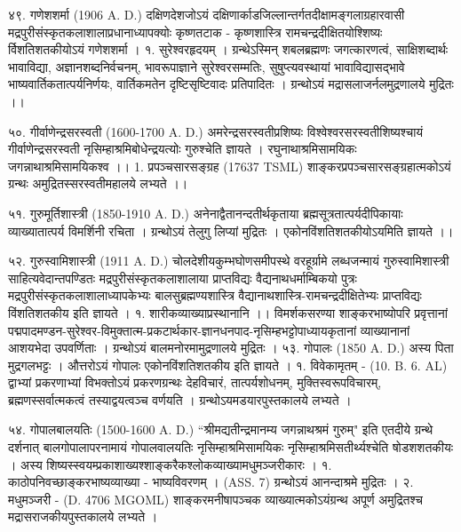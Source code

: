 ४९. गणेशशर्मा (1906 A. D.)
दक्षिणदेशजोऽयं दक्षिणार्काडजिल्लान्तर्गतदीक्षामङ्गलाग्रहारवासी मद्रपुरीसंस्कृतकलाशालाप्रधानाध्यापक्योः कृष्णतटाक - कृष्णशास्त्रि रामचन्द्रदीक्षितयोश्शिष्यः र्विशतिशतकीयोऽयं गणेशशर्मा ।
१. सुरेश्वरहृदयम् । ग्रन्थेऽस्मिन् शबलब्रह्मणः जगत्कारणत्वं, साक्षिशब्दार्थः भावाविद्या, अज्ञानशब्दनिर्वचनम्, भावरूपाज्ञाने सुरेश्वरसम्मतिः, सुषुप्त्यवस्थायां भावाविद्यासद्भावे भाष्यवार्तिकतात्पर्यनिर्णयः, वार्तिकमतेन दृष्टिसृष्टिवादः प्रतिपादितः । ग्रन्थोऽयं मद्रासलाजर्नलमुद्रणालये मुद्रितः ।।

५०. गीर्वाणेन्द्रसरस्वती (1600-1700 A. D.)
अमरेन्द्रसरस्वतीप्रशिष्यः विश्वेश्वरसरस्वतीशिष्यश्चायं गीर्वाणेन्द्रसरस्वती नृसिम्हाश्रमिबोधेन्द्रयत्योः गुरुश्चेति ज्ञायते । रघुनाथाश्रमिसामयिकः जगन्नाथाश्रमिसामयिकश्व ।।
1. प्रपञ्चसारसङ्ग्रह (17637 TSML)
शाङ्करप्रपञ्चसारसङ्ग्रहात्मकोऽयं ग्रन्थः अमुद्रितस्सरस्वतीमहालये लभ्यते ।।

५१. गुरुमूर्तिशास्त्री (1850-1910 A. D.)
अनेनाद्वैतानन्दतीर्थकृताया ब्रह्मसूत्रतात्पर्यदीपिकायाः व्याख्यातात्पर्य विमर्शिनी रचिता । ग्रन्थोऽयं तेलुगु लिप्यां मुद्रितः । एकोनविंशतिशतकीयोऽयमिति ज्ञायते ।।

५२.
गुरुस्वामिशास्त्री (1911 A. D.)
चोलदेशीयकुम्भघोणसमीपस्थे वरहूर्ग्रामे लब्धजन्मायं गुरुस्वामिशास्त्री साहित्यवेदान्तपण्डितः मद्रपुरीसंस्कृतकलाशालाया प्राप्तविद्यः वैद्यनाथधर्माम्बिकयो पुत्रः मद्रपुरीसंस्कृतकलाशालाध्यापकेभ्यः बालसुब्रह्मण्यशास्त्रि वैद्यानाथशास्त्रि-रामचन्द्रदीक्षितेभ्यः प्राप्तविद्यः विंशतिशतकीय इति ज्ञायते ।
१. शारीकव्याख्याप्रस्थानानि ।।
विमर्शकसरण्या शाङ्करभाष्योपरि प्रवृत्तानां पद्मपादमण्डन-सुरेश्वर-विमुक्तात्म-प्रकटार्थकार-ज्ञानधनपाद-नृसिम्हभट्टोपाध्यायकृतानां व्याख्यानानां आशयभेदा उपवर्णिताः । ग्रन्थोऽयं बालमनोरमामुद्रणालये मुद्रितः ।
५३. गोपालः (1850 A. D.)
अस्य पिता मुद्रगलभट्टः । औत्तरोऽयं गोपालः एकोनविंशतिशतकीय इति ज्ञायते ।
१. विवेकामृतम् - (10. B. 6. AL) द्वाभ्यां प्रकरणाभ्यां विभक्तोऽयं प्रकरणग्रन्थः देहविचारं, तात्पर्यशोधनम्, मुक्तिस्वरूपविचारम्, ब्रह्मणस्सर्वात्मकत्वं तस्याद्वयत्वञ्च वर्णयति । ग्रन्थोऽयमडयारपुस्तकालये लभ्यते ।

५४. गोपालबालयतिः (1500-1600 A. D.)
``श्रीमद्यतीन्द्रमानम्य जगन्नाथश्रमं गुरुम्" इति एतदीये ग्रन्थे दर्शनात् बालगोपालापरनामायं गोपालवालयतिः नृसिम्हाश्रमिसामयिकः नृसिम्हाश्रमिसतीर्थ्यश्चेति षोडशशतकीयः । अस्य शिष्यस्स्वयम्प्रकाशाख्यश्शाङ्करैकश्लोकव्याख्यामधुमञ्जरीकारः ।
१. काठोपनिवच्छाङ्करभाष्यव्याख्या - भाष्यविवरणम् । (ASS. 7) ग्रन्थोऽयं आनन्दाश्रमे मुद्रितः ।
२. मधुमञ्जरी - (D. 4706 MGOML) शाङ्करमनीषापञ्चक व्याख्यात्मकोऽयंग्रन्थ अपूर्ण अमुद्रितश्च मद्रासराजकीयपुस्तकालये लभ्यते । 

